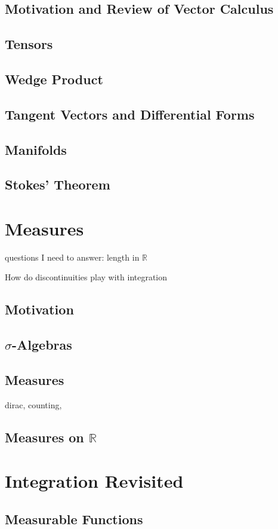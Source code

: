 \documentclass{article}
\newcommand{\R}{\mathbb{R}}
\theoremstyle{definition}
\begin{document}
\subsection{Motivation and Review of Vector Calculus}
\subsection{Tensors}
\subsection{Wedge Product}
\subsection{Tangent Vectors and Differential Forms}
\subsection{Manifolds}
\subsection{Stokes' Theorem}
\section{Measures}
questions I need to answer: length in $ \R $

How do discontinuities play with integration
\subsection{Motivation}
\subsection{$ \sigma $-Algebras}
\subsection{Measures}
dirac, counting, 
\subsection{Measures on $ \R $}
\section{Integration Revisited}
\subsection{Measurable Functions}
\end{document}
